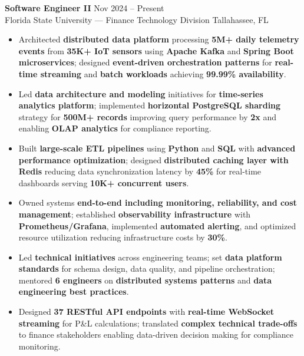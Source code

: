 \documentclass[letterpaper,10pt]{article}
\newcommand{\resumeItem}[1]{\item\small #1}
\newcommand{\resumeSubheading}[4]{
  \vspace{6pt}
  \noindent
  \textbf{#1} \hfill {\footnotesize #2} \\
  [-1pt]
  \noindent
  \small #3 \hfill {\small #4}
  \vspace{3pt}
}
\newcommand{\resumeItemsStart}{\vspace{-2pt}\begin{itemize}}
\newcommand{\resumeItemsEnd}{\end{itemize}\vspace{6pt}}
\begin{document}
\resumeSubheading
{Software Engineer II}{Nov 2024 -- Present}
{Florida State University — Finance Technology Division}{Tallahassee, FL}
\resumeItemsStart
\resumeItem{Architected \textbf{distributed data platform} processing \textbf{5M+ daily telemetry events} from \textbf{35K+ IoT sensors} using \textbf{Apache Kafka} and \textbf{Spring Boot microservices}; designed \textbf{event-driven orchestration patterns} for \textbf{real-time streaming} and \textbf{batch workloads} achieving \textbf{99.99\% availability}.}
\resumeItem{Led \textbf{data architecture and modeling} initiatives for \textbf{time-series analytics platform}; implemented \textbf{horizontal PostgreSQL sharding} strategy for \textbf{500M+ records} improving query performance by \textbf{2x} and enabling \textbf{OLAP analytics} for compliance reporting.}
\resumeItem{Built \textbf{large-scale ETL pipelines} using \textbf{Python} and \textbf{SQL} with \textbf{advanced performance optimization}; designed \textbf{distributed caching layer with Redis} reducing data synchronization latency by \textbf{45\%} for real-time dashboards serving \textbf{10K+ concurrent users}.}
\resumeItem{Owned systems \textbf{end-to-end including monitoring, reliability, and cost management}; established \textbf{observability infrastructure} with \textbf{Prometheus/Grafana}, implemented \textbf{automated alerting}, and optimized resource utilization reducing infrastructure costs by \textbf{30\%}.}
\resumeItem{Led \textbf{technical initiatives} across engineering teams; set \textbf{data platform standards} for schema design, data quality, and pipeline orchestration; mentored \textbf{6 engineers} on \textbf{distributed systems patterns} and \textbf{data engineering best practices}.}
\resumeItem{Designed \textbf{37 RESTful API endpoints} with \textbf{real-time WebSocket streaming} for P\&L calculations; translated \textbf{complex technical trade-offs} to finance stakeholders enabling data-driven decision making for compliance monitoring.}
\resumeItemsEnd
\vspace{-12pt}
\end{document}
